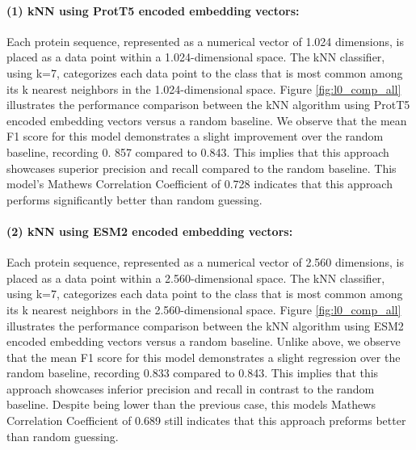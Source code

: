 \documentclass{bioinfo}
\begin{document}
\paragraph{(1) kNN using ProtT5 encoded embedding vectors:}
Each protein sequence, represented as a numerical vector of 1.024 dimensions, is placed as a data 
point within a 1.024-dimensional space. The kNN classifier, using k=7,
categorizes each data point to the class that is most common among its k nearest neighbors in the 1.024-dimensional space.
Figure \ref{fig:l0_comp_all} illustrates the performance comparison between the kNN algorithm using ProtT5 encoded embedding vectors versus a random baseline. 
We observe that the mean F1 score for this model demonstrates a slight improvement over the random baseline,
recording 0. 857 compared to 0.843. This implies that this approach showcases superior precision and recall compared to the random baseline.
This model's Mathews Correlation Coefficient of 0.728 indicates that this approach performs significantly better than random guessing.


\paragraph{(2) kNN using ESM2 encoded embedding vectors:}
Each protein sequence, represented as a numerical vector of 2.560 dimensions, is placed as a data point within a 2.560-dimensional space.
The kNN classifier, using k=7, categorizes each data point to the class that is most common among its k nearest neighbors in the 2.560-dimensional space.
Figure \ref{fig:l0_comp_all} illustrates the performance comparison between the kNN algorithm using ESM2 encoded embedding vectors versus a random baseline.
Unlike above, we observe that the mean F1 score for this model demonstrates a slight regression over the random baseline, recording 0.833
compared to 0.843. This implies that this approach showcases inferior precision and recall in contrast to the random baseline.
Despite being lower than the previous case, this models Mathews Correlation Coefficient of 0.689 still indicates that this approach preforms 
better than random guessing.
\end{document}
